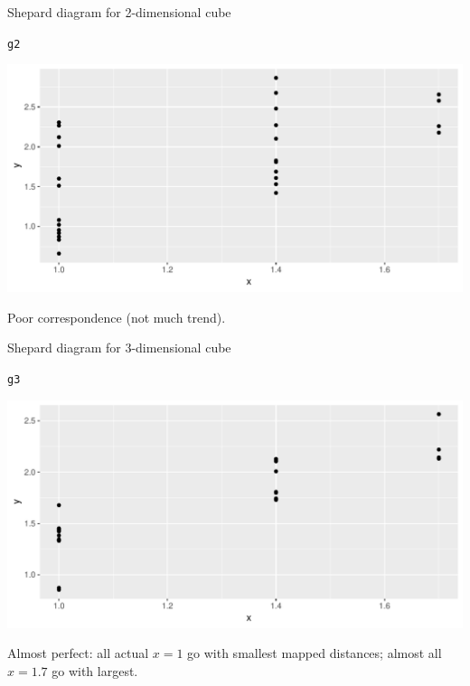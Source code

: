 \documentclass[unknownkeysallowed]{beamer}\usepackage[]{graphicx}\usepackage[]{color}
\makeatletter
\def\maxwidth{ %
  \ifdim\Gin@nat@width>\linewidth
    \linewidth
  \else
    \Gin@nat@width
  \fi
}
\newcommand{\hlstd}[1]{\textcolor[rgb]{0.345,0.345,0.345}{#1}}%
\newenvironment{kframe}{%
 \def\at@end@of@kframe{}%
 \ifinner\ifhmode%
  \def\at@end@of@kframe{\end{minipage}}%
  \begin{minipage}{\columnwidth}%
 \fi\fi%
 \def\FrameCommand##1{\hskip\@totalleftmargin \hskip-\fboxsep
 \colorbox{shadecolor}{##1}\hskip-\fboxsep
     \hskip-\linewidth \hskip-\@totalleftmargin \hskip\columnwidth}%
 \MakeFramed {\advance\hsize-\width
   \@totalleftmargin\z@ \linewidth\hsize
   \@setminipage}}%
 {\par\unskip\endMakeFramed%
 \at@end@of@kframe}
\newenvironment{knitrout}{}{} %
\makeatother
\begin{document}
\begin{frame}[fragile]{Shepard diagram for 2-dimensional cube}

\begin{knitrout}
\color{fgcolor}\begin{kframe}
\begin{alltt}
\hlstd{g2}
\end{alltt}
\end{kframe}
\includegraphics[width=\maxwidth]{figure/unnamed-chunk-442-1} 

\end{knitrout}

Poor correspondence (not much trend).
\end{frame}

\begin{frame}[fragile]{Shepard diagram for 3-dimensional cube}
  
\begin{knitrout}
\color{fgcolor}\begin{kframe}
\begin{alltt}
\hlstd{g3}
\end{alltt}
\end{kframe}
\includegraphics[width=\maxwidth]{figure/unnamed-chunk-443-1} 

\end{knitrout}
  
Almost perfect: all actual $x=1$ go with smallest mapped distances; almost
all $x=1.7$ go with  largest.
\end{frame}
\end{document}
